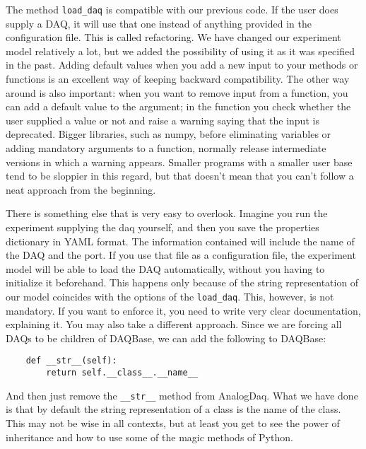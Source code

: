The method \texttt{load_daq} is compatible with our previous code. If the user does supply a DAQ, it will use that one instead of anything provided in the configuration file. This is called refactoring. We have changed our experiment model relatively a lot, but we added the possibility of using it as it was specified in the past. Adding default values when you add a new input to your methods or functions is an excellent way of keeping backward compatibility. The other way around is also important: when you want to remove input from a function, you can add a default value to the argument; in the function you check whether the user supplied a value or not and raise a warning saying that the input is deprecated. Bigger libraries, such as numpy, before eliminating variables or adding mandatory arguments to a function, normally release intermediate versions in which a warning appears. Smaller programs with a smaller user base tend to be sloppier in this regard, but that doesn't mean that you can't follow a neat approach from the beginning. 


There is something else that is very easy to overlook. Imagine you run the experiment supplying the daq yourself, and then you save the properties dictionary in YAML format. The information contained will include the name of the DAQ and the port. If you use that file as a configuration file, the experiment model will be able to load the DAQ automatically, without you having to initialize it beforehand. This happens only because of the string representation of our model coincides with the options of the \texttt{load_daq}. This, however, is not mandatory. If you want to enforce it, you need to write very clear documentation, explaining it. You may also take a different approach. Since we are forcing all DAQs to be children of DAQBase, we can add the following to DAQBase:

\begin{verbatim}
    def __str__(self):
        return self.__class__.__name__
\end{verbatim}

And then just remove the \texttt{__str__} method from AnalogDaq. What we have done is that by default the string representation of a class is the name of the class. This may not be wise in all contexts, but at least you get to see the power of inheritance and how to use some of the magic methods of Python. 

